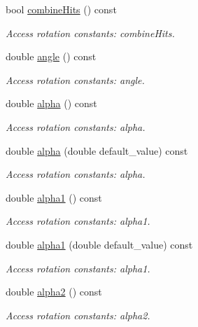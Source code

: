 \begin{DoxyCompactItemize}
bool \hyperlink{struct_d_d4hep_1_1_x_m_l_1_1_dimension_aaef5b1bfa1b163529863ab90457c4d29}{combine\+Hits} () const
\begin{DoxyCompactList}\small\item\em Access rotation constants\+: combine\+Hits. \end{DoxyCompactList}\item 
double \hyperlink{struct_d_d4hep_1_1_x_m_l_1_1_dimension_a92e6af995d164dad00e6fbd087b28d1c}{angle} () const
\begin{DoxyCompactList}\small\item\em Access rotation constants\+: angle. \end{DoxyCompactList}\item 
double \hyperlink{struct_d_d4hep_1_1_x_m_l_1_1_dimension_aec3b76886a8f3a7040d96db3f43d0034}{alpha} () const
\begin{DoxyCompactList}\small\item\em Access rotation constants\+: alpha. \end{DoxyCompactList}\item 
double \hyperlink{struct_d_d4hep_1_1_x_m_l_1_1_dimension_a5a98288a8792bff7733937ff26d65b4c}{alpha} (double default\+\_\+value) const
\begin{DoxyCompactList}\small\item\em Access rotation constants\+: alpha. \end{DoxyCompactList}\item 
double \hyperlink{struct_d_d4hep_1_1_x_m_l_1_1_dimension_a85be000bc2acf3dac7cbd8dd2455170e}{alpha1} () const
\begin{DoxyCompactList}\small\item\em Access rotation constants\+: alpha1. \end{DoxyCompactList}\item 
double \hyperlink{struct_d_d4hep_1_1_x_m_l_1_1_dimension_a20a08c7dcdd420901b45662eaba04a72}{alpha1} (double default\+\_\+value) const
\begin{DoxyCompactList}\small\item\em Access rotation constants\+: alpha1. \end{DoxyCompactList}\item 
double \hyperlink{struct_d_d4hep_1_1_x_m_l_1_1_dimension_a55531506942a11ff2691e7d89dc8d94e}{alpha2} () const
\begin{DoxyCompactList}\small\item\em Access rotation constants\+: alpha2. \end{DoxyCompactList}\item 

\end{DoxyCompactItemize}

